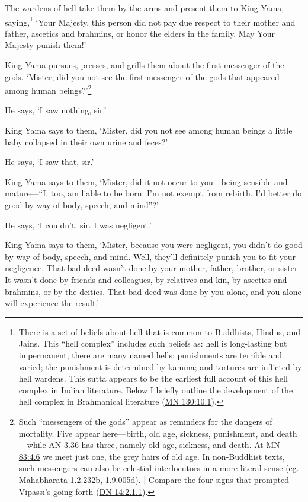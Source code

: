 \documentclass[12pt,openany]{book}%
\begin{document}
The wardens of hell take them by the arms and present them to King Yama, saying,\footnote{There is a set of beliefs about hell that is common to Buddhists, Hindus, and Jains. This “hell complex” includes such beliefs as: hell is long-lasting but impermanent; there are many named hells; punishments are terrible and varied; the punishment is determined by kamma; and tortures are inflicted by hell wardens. This sutta appears to be the earliest full account of this hell complex in Indian literature. Below I briefly outline the development of the hell complex in Brahmanical literature (\href{https://suttacentral.net/mn130/en/sujato\#10.1}{MN 130:10.1}). } ‘Your Majesty, this person did not pay due respect to their mother and father, ascetics and brahmins, or honor the elders in the family. May Your Majesty punish them!’ 

King Yama pursues, presses, and grills them about the first messenger of the gods. ‘Mister, did you not see the first messenger of the gods that appeared among human beings?’\footnote{Such “messengers of the gods” appear as reminders for the dangers of mortality. Five appear here—birth, old age, sickness, punishment, and death—while \href{https://suttacentral.net/an3.36/en/sujato}{AN 3.36} has three, namely old age, sickness, and death. At \href{https://suttacentral.net/mn83/en/sujato\#4.6}{MN 83:4.6} we meet just one, the grey hairs of old age. In non-Buddhist texts, such messengers can also be celestial interlocutors in a more literal sense (eg. \textsanskrit{Mahābhārata} 1.2.232b, 1.9.005d). | Compare the four signs that prompted \textsanskrit{Vipassī}’s going forth (\href{https://suttacentral.net/dn14/en/sujato\#2.1.1}{DN 14:2.1.1}). } 

He says, ‘I saw nothing, sir.’ 

King Yama says to them, ‘Mister, did you not see among human beings a little baby collapsed in their own urine and feces?’ 

He says, ‘I saw that, sir.’ 

King Yama says to them, ‘Mister, did it not occur to you—being sensible and mature—“I, too, am liable to be born. I’m not exempt from rebirth. I’d better do good by way of body, speech, and mind”?’ 

He says, ‘I couldn’t, sir. I was negligent.’ 

King Yama says to them, ‘Mister, because you were negligent, you didn’t do good by way of body, speech, and mind. Well, they’ll definitely punish you to fit your negligence. That bad deed wasn’t done by your mother, father, brother, or sister. It wasn’t done by friends and colleagues, by relatives and kin, by ascetics and brahmins, or by the deities. That bad deed was done by you alone, and you alone will experience the result.’ 
\end{document}
